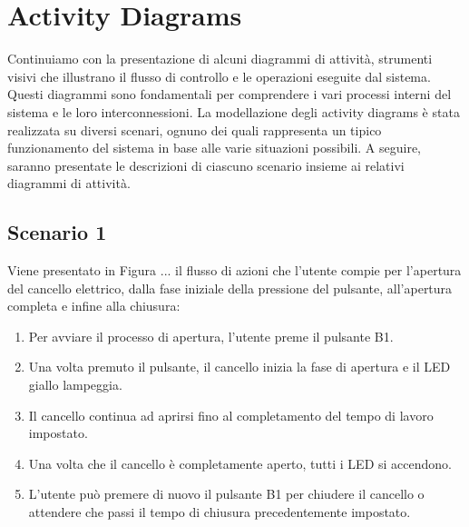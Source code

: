\documentclass[12pt]{article}
\begin{document}
\newpage
\section{Activity Diagrams}
Continuiamo con la presentazione di alcuni diagrammi di attività, strumenti visivi che illustrano il flusso di controllo e le operazioni eseguite dal sistema. Questi diagrammi sono fondamentali per comprendere i vari processi interni del sistema e le loro interconnessioni.
La modellazione degli activity diagrams è stata realizzata su diversi scenari, ognuno dei quali rappresenta un tipico funzionamento del sistema in base alle varie situazioni possibili. A seguire, saranno presentate le descrizioni di ciascuno scenario insieme ai relativi diagrammi di attività.

\subsection{Scenario 1}
Viene presentato in Figura ... il flusso di azioni che l’utente compie per l’apertura del cancello elettrico, dalla fase iniziale della pressione del pulsante, all’apertura completa e infine alla chiusura:

\begin{enumerate}
    \item Per avviare il processo di apertura, l’utente preme il pulsante B1.
    \item Una volta premuto il pulsante, il cancello inizia la fase di apertura e il LED giallo lampeggia.
    \item Il cancello continua ad aprirsi fino al completamento del tempo di lavoro impostato.
    \item Una volta che il cancello è completamente aperto, tutti i LED si accendono.
    \item L'utente può premere di nuovo il pulsante B1 per chiudere il cancello o attendere che passi il tempo di chiusura precedentemente impostato.
\end{enumerate}
\end{document}
